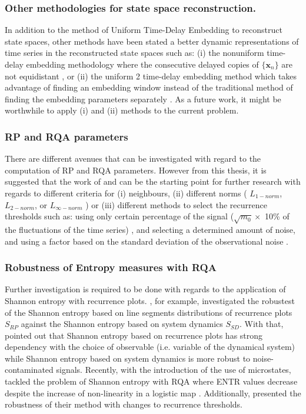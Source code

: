\subsubsection*{Other methodologies for state space reconstruction.}
In addition to the method of Uniform Time-Delay Embedding to reconstruct
state spaces, other methods have been stated a better dynamic 
representations of time series in the reconstructed state spaces such as: 
(i) the nonuniform time-delay embedding methodology  
where the consecutive delayed copies of $\{ \boldsymbol{x}_n  \} $ are not
equidistant
\citep{pecora2007, uzal2011, 
Quintana-Duque2012, Quintana-Duque2013, Quintana-Duque2016}, or 
(ii) the uniform 2 time-delay embedding method which takes advantage 
of finding an embedding window instead of the traditional method 
of finding the embedding parameters separately \citep{gomezgarcia2014}.
As a future work, it might be worthwhile to apply (i) and (ii) 
methods to the current problem. 

\subsubsection*{RP and RQA parameters}
There are different avenues that can be investigated 
with regard to the computation of RP and RQA parameters.
However from this thesis, it is suggested that the work of 
\cite{marwan2007} and \cite{marwan2015} can be the starting point 
for further research with regards to different criteria for 
(i) neighbours, 
(ii) different norms ( $L_{1-norm}$, $L_{2-norm}$, or $L_{\infty-norm}$ ) or 
(iii) different methods to select the recurrence thresholds such as: 
using only certain percentage of the signal
($\sqrt{m_0} \times$ 10\% of the fluctuations of the time series)
\citep{letellier2006}, and selecting a determined amount of noise, and 
using a factor based on the standard deviation of the 
observational noise \citep{marwan2007}.

\subsubsection*{Robustness of Entropy measures with RQA}
Further investigation is required 
to be done with regards to the application of Shannon entropy with 
recurrence plots.
\cite{letellier2006}, for example, investigated the robustest of 
the Shannon entropy based on line segments distributions of 
recurrence plots $S_{RP}$ 
against the Shannon entropy based on system dynamics $S_{SD}$.
With that, \cite{letellier2006} pointed out that Shannon entropy based on 
recurrence plots has strong dependency with the choice of observable 
(i.e. variable of the dynamical system) while Shannon entropy based on 
system dynamics is more robust to noise-contaminated signals.
Recently, with the introduction of the use of microstates, 
\cite{corso2017} tackled the problem of Shannon entropy with RQA
where ENTR values decrease despite the increase of non-linearity 
in a logistic map \citep{marwan2007}. 
Additionally, \cite{corso2017} presented the robustness of their method 
with changes to recurrence thresholds.

